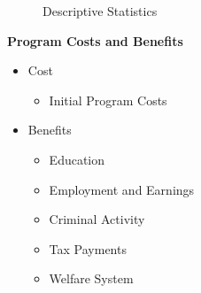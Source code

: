 \begin{frame}\begin{figure}\caption{Descriptive Statistics}
\end{figure}\end{frame}
\begin{frame}\textbf{Program Costs and Benefits}
\begin{itemize}
\item Cost
\begin{itemize}
\item Initial Program Costs
\end{itemize}
\item Benefits
\begin{itemize}
\item Education
\item Employment and Earnings
\item Criminal Activity
\item Tax Payments
\item Welfare System
\end{itemize}
\end{itemize}
\end{frame}
